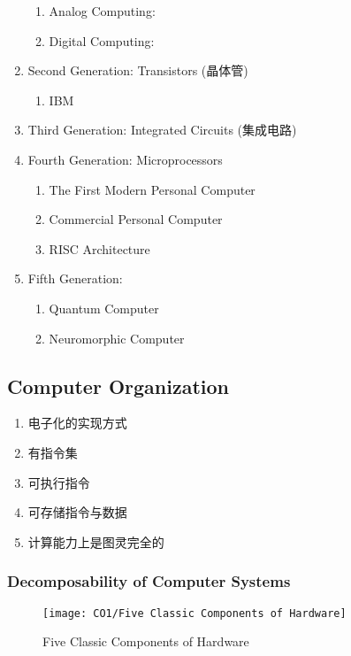 \begin{enumerate}
\begin{enumerate}
        \item Analog Computing: 
        \item Digital Computing: 
    \end{enumerate}
    \item Second Generation: Transistors (晶体管)
    \begin{enumerate}
        \item IBM
    \end{enumerate}
    \item Third Generation: Integrated Circuits (集成电路)
    \item Fourth Generation: Microprocessors
    \begin{enumerate}
        \item The First Modern Personal Computer
        \item Commercial Personal Computer
        \item RISC Architecture
    \end{enumerate}
    \item Fifth Generation:
    \begin{enumerate}
        \item Quantum Computer
        \item Neuromorphic Computer
    \end{enumerate} 
\end{enumerate}

\subsection{Computer Organization}

\begin{enumerate}
    \item 电子化的实现方式
    \item 有指令集
    \item 可执行指令
    \item 可存储指令与数据
    \item 计算能力上是图灵完全的
\end{enumerate}

\subsubsection{Decomposability of Computer Systems}

\begin{figure}[H]
    \centering
    \texttt{[image: CO1/Five Classic Components of Hardware]}
    \caption{Five Classic Components of Hardware}
\end{figure}


